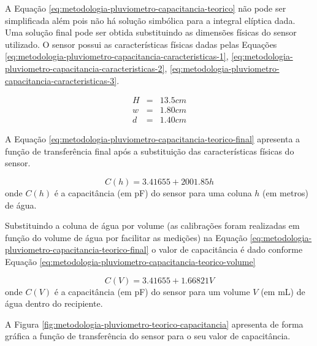 \documentclass[a4paper]{instrumentacao}
\begin{document}
A Equação \ref{eq:metodologia-pluviometro-capacitancia-teorico} não pode ser simplificada além pois não há solução simbólica para a integral elíptica dada. Uma solução final pode ser obtida substituindo as dimensões físicas do sensor utilizado. O sensor possui as características físicas dadas pelas Equações \ref{eq:metodologia-pluviometro-capacitancia-caracteristicas-1}, \ref{eq:metodologia-pluviometro-capacitancia-caracteristicas-2}, \ref{eq:metodologia-pluviometro-capacitancia-caracteristicas-3}.

\begin{eqnarray}
	H &=& 13.5cm \label{eq:metodologia-pluviometro-capacitancia-caracteristicas-1} \\
	w &=& 1.80cm \label{eq:metodologia-pluviometro-capacitancia-caracteristicas-2} \\
	d &=& 1.40cm \label{eq:metodologia-pluviometro-capacitancia-caracteristicas-3}
\end{eqnarray}

A Equação \ref{eq:metodologia-pluviometro-capacitancia-teorico-final} apresenta a função de transferência final após a substituição das características físicas do sensor.

\begin{equation}
	C(h) = 3.41655 + 2001.85 h
	\label{eq:metodologia-pluviometro-capacitancia-teorico-final}
\end{equation}
\noindent onde $C(h)$ é a capacitância (em pF) do sensor para uma coluna $h$ (em metros) de água.

Substituindo a coluna de água por volume (as calibrações foram realizadas em função do volume de água por facilitar as medições) na Equação \ref{eq:metodologia-pluviometro-capacitancia-teorico-final} o valor de capacitância é dado conforme Equação \ref{eq:metodologia-pluviometro-capacitancia-teorico-volume}

\begin{equation}
	C(V) = 3.41655 + 1.66821 V
	\label{eq:metodologia-pluviometro-capacitancia-teorico-volume}
\end{equation}
\noindent onde $C(V)$ é a capacitância (em pF) do sensor para um volume $V$ (em mL) de água dentro do recipiente.

A Figura \ref{fig:metodologia-pluviometro-teorico-capacitancia} apresenta de forma gráfica a função de transferência do sensor para o seu valor de capacitância.
\end{document}
